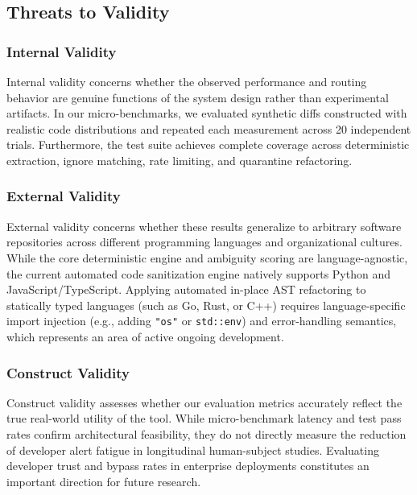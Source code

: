 \subsection{Threats to Validity}
\subsubsection{Internal Validity}
Internal validity concerns whether the observed performance and routing behavior are genuine functions of the system design rather than experimental artifacts. In our micro-benchmarks, we evaluated synthetic diffs constructed with realistic code distributions and repeated each measurement across 20 independent trials. Furthermore, the test suite achieves complete coverage across deterministic extraction, ignore matching, rate limiting, and quarantine refactoring.

\subsubsection{External Validity}
External validity concerns whether these results generalize to arbitrary software repositories across different programming languages and organizational cultures. While the core deterministic engine and ambiguity scoring are language-agnostic, the current automated code sanitization engine natively supports Python and JavaScript/TypeScript. Applying automated in-place AST refactoring to statically typed languages (such as Go, Rust, or C++) requires language-specific import injection (e.g., adding \texttt{"os"} or \texttt{std::env}) and error-handling semantics, which represents an area of active ongoing development.

\subsubsection{Construct Validity}
Construct validity assesses whether our evaluation metrics accurately reflect the true real-world utility of the tool. While micro-benchmark latency and test pass rates confirm architectural feasibility, they do not directly measure the reduction of developer alert fatigue in longitudinal human-subject studies. Evaluating developer trust and bypass rates in enterprise deployments constitutes an important direction for future research.
